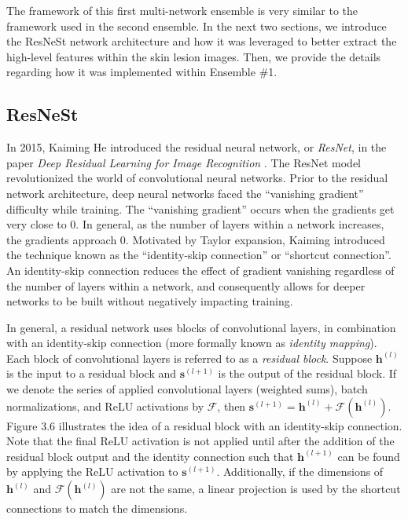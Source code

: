 \documentclass [MAS] {uclathes}
\begin{document}
The framework of this first multi-network ensemble is very similar to the framework used in the second ensemble. In the next two sections, we introduce the ResNeSt network architecture and how it was leveraged to better extract the high-level features within the skin lesion images. Then, we provide the details regarding how it was implemented within Ensemble \#1.

\subsection{ResNeSt}

In 2015, Kaiming He introduced the residual neural network, or \textit{ResNet}, in the paper \textit{Deep Residual Learning for Image Recognition} \cite{resnet}. The ResNet model revolutionized the world of convolutional neural networks. Prior to the residual network architecture, deep neural networks faced the ``vanishing gradient'' difficulty while training. The ``vanishing gradient'' occurs when the gradients get very close to 0. In general, as the number of layers within a network increases, the gradients approach 0. Motivated by Taylor expansion, Kaiming introduced the technique known as the ``identity-skip connection'' or ``shortcut connection''. An identity-skip connection reduces the effect of gradient vanishing regardless of the number of layers within a network, and consequently allows for deeper networks to be built without negatively impacting training. 

In general, a residual network uses blocks of convolutional layers, in combination with an identity-skip connection (more formally known as \textit{identity mapping}). Each block of convolutional layers is referred to as a \textit{residual block}. Suppose $\mathbf{h}^{(l)}$ is the input to a residual block and $\mathbf{s}^{(l+1)}$ is the output of the residual block. If we denote the series of applied convolutional layers (weighted sums), batch normalizations, and ReLU activations by $\mathcal{F}$, then $\mathbf{s}^{(l+1)} = \mathbf{h}^{(l)} + \mathcal{F}(\mathbf{h}^{(l)})$. Figure 3.6 illustrates the idea of a residual block with an identity-skip connection. Note that the final ReLU activation is not applied until after the addition of the residual block output and the identity connection such that $\mathbf{h}^{(l+1)}$ can be found by applying the ReLU activation to $\mathbf{s}^{(l+1)}$. Additionally, if the dimensions of $\mathbf{h}^{(l)}$ and $\mathcal{F}(\mathbf{h}^{(l)})$ are not the same, a linear projection is used by the shortcut connections to match the dimensions.
\end{document}
